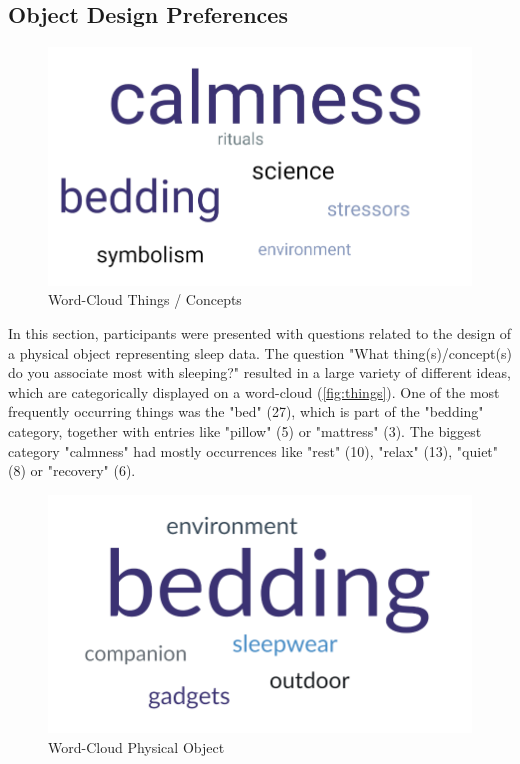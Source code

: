 \documentclass[
  a4paper,  %
  twoside,  %
  bibliography=totoc,
  headsepline,
  cleardoublepage=empty,
  parskip=half,
  draft=false
]{scrbook}
\begin{document}
\subsection{Object Design Preferences}
\begin{figure} [H]
    \centering
    \includegraphics[width=\paperwidth/2]{graphics/word-cloud_Things_resize.png}
    \caption{Word-Cloud Things / Concepts}
    \label{fig:things}
\end{figure}
In this section, participants were presented with questions related to the design of a physical object representing sleep data. The question "What thing(s)/concept(s) do you associate most with sleeping?" resulted in a large variety of different ideas, which are categorically displayed on a word-cloud (\autoref{fig:things}). One of the most frequently occurring things was the "bed" (27), which is part of the "bedding" category, together with entries like "pillow" (5) or "mattress" (3). The biggest category "calmness" had mostly occurrences like "rest" (10), "relax" (13), "quiet" (8) or "recovery" (6).

\begin{figure} [H]
    \centering
    \includegraphics[width=\paperwidth/2]{graphics/word-cloud_physical_resize.png}
    \caption{Word-Cloud Physical Object}
    \label{fig:physical}
\end{figure}
\end{document}
